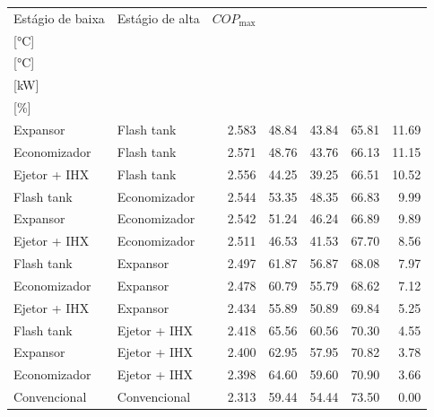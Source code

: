 {\small\setlength{\tabcolsep}{4pt}\renewcommand{\arraystretch}{1.12}
\begin{tabular}{llrrrrr}
\toprule
Estágio de baixa & Estágio de alta & $COP_{\max}$ & \shortstack{$T_{\mathrm{cond,l}}^*$\\{[°C]}} & \shortstack{$T_{\mathrm{evap,h}}^*$\\{[°C]}} & \shortstack{$\dot W_{\mathrm{liq}}$\\{[kW]}} & \shortstack{$\Delta COP_{\mathrm{opt}}$\\{[\%]}} \\
\midrule
Expansor & Flash tank & 2.583 & 48.84 & 43.84 & 65.81 & 11.69 \\
Economizador & Flash tank & 2.571 & 48.76 & 43.76 & 66.13 & 11.15 \\
Ejetor + IHX & Flash tank & 2.556 & 44.25 & 39.25 & 66.51 & 10.52 \\
Flash tank & Economizador & 2.544 & 53.35 & 48.35 & 66.83 & 9.99 \\
Expansor & Economizador & 2.542 & 51.24 & 46.24 & 66.89 & 9.89 \\
Ejetor + IHX & Economizador & 2.511 & 46.53 & 41.53 & 67.70 & 8.56 \\
Flash tank & Expansor & 2.497 & 61.87 & 56.87 & 68.08 & 7.97 \\
Economizador & Expansor & 2.478 & 60.79 & 55.79 & 68.62 & 7.12 \\
Ejetor + IHX & Expansor & 2.434 & 55.89 & 50.89 & 69.84 & 5.25 \\
Flash tank & Ejetor + IHX & 2.418 & 65.56 & 60.56 & 70.30 & 4.55 \\
Expansor & Ejetor + IHX & 2.400 & 62.95 & 57.95 & 70.82 & 3.78 \\
Economizador & Ejetor + IHX & 2.398 & 64.60 & 59.60 & 70.90 & 3.66 \\
Convencional & Convencional & 2.313 & 59.44 & 54.44 & 73.50 & 0.00 \\
\bottomrule
\end{tabular}
}
